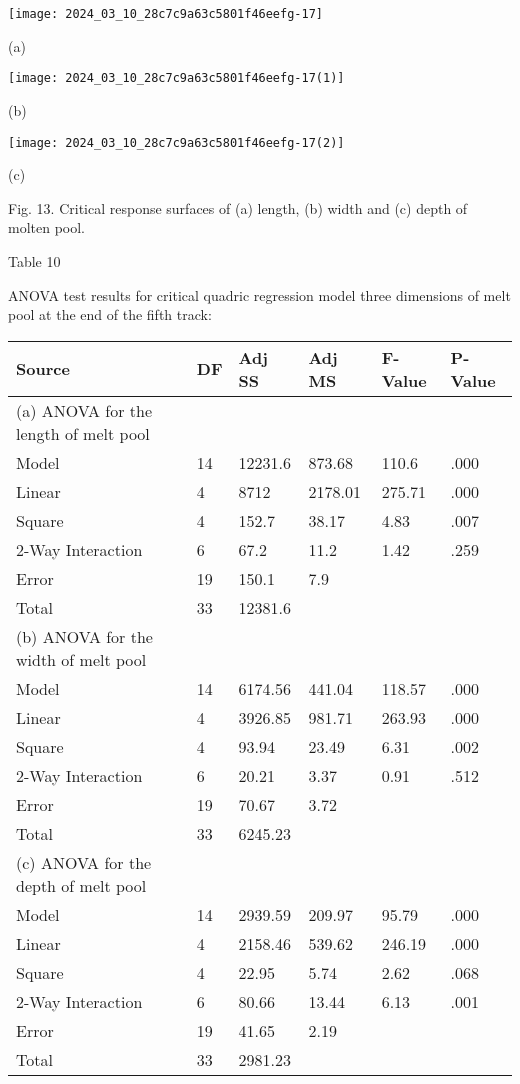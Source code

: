 \documentclass[10pt]{article}
\begin{document}
\begin{center}
\texttt{[image: 2024\_03\_10\_28c7c9a63c5801f46eefg-17]}
\end{center}

(a)

\begin{center}
\texttt{[image: 2024\_03\_10\_28c7c9a63c5801f46eefg-17(1)]}
\end{center}

(b)

\begin{center}
\texttt{[image: 2024\_03\_10\_28c7c9a63c5801f46eefg-17(2)]}
\end{center}

(c)

Fig. 13. Critical response surfaces of (a) length, (b) width and (c) depth of molten pool.

Table 10

ANOVA test results for critical quadric regression model three dimensions of melt pool at the end of the fifth track:

\begin{center}
\begin{tabular}{llllll}
\hline
Source & DF & Adj SS & Adj MS & F-Value & P-Value \\
\hline
(a) ANOVA for the length of melt pool &  &  &  &  &  \\
Model & 14 & 12231.6 & 873.68 & 110.6 & .000 \\
Linear & 4 & 8712 & 2178.01 & 275.71 & .000 \\
Square & 4 & 152.7 & 38.17 & 4.83 & .007 \\
2-Way Interaction & 6 & 67.2 & 11.2 & 1.42 & .259 \\
Error & 19 & 150.1 & 7.9 &  &  \\
Total & 33 & 12381.6 &  &  &  \\
(b) ANOVA for the width of melt pool &  &  &  &  &  \\
Model & 14 & 6174.56 & 441.04 & 118.57 & .000 \\
Linear & 4 & 3926.85 & 981.71 & 263.93 & .000 \\
Square & 4 & 93.94 & 23.49 & 6.31 & .002 \\
2-Way Interaction & 6 & 20.21 & 3.37 & 0.91 & .512 \\
Error & 19 & 70.67 & 3.72 &  &  \\
Total & 33 & 6245.23 &  &  &  \\
(c) ANOVA for the depth of melt pool &  &  &  &  &  \\
Model & 14 & 2939.59 & 209.97 & 95.79 & .000 \\
Linear & 4 & 2158.46 & 539.62 & 246.19 & .000 \\
Square & 4 & 22.95 & 5.74 & 2.62 & .068 \\
2-Way Interaction & 6 & 80.66 & 13.44 & 6.13 & .001 \\
Error & 19 & 41.65 & 2.19 &  &  \\
Total & 33 & 2981.23 &  &  &  \\
\hline
\end{tabular}
\end{center}
\end{document}
